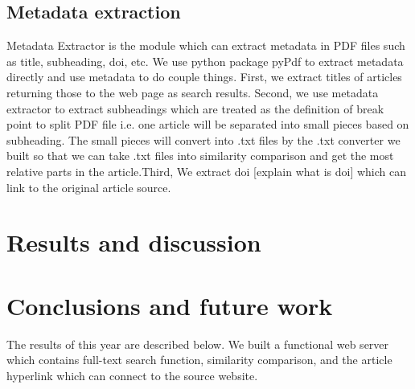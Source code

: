 \documentclass[a4paper,twocolumn,twoside]{article}
\begin{document}
	\subsection{Metadata extraction}
    Metadata Extractor is the module which can extract metadata in PDF files such as title, subheading, doi, etc. We use python package pyPdf to extract metadata directly and use metadata to do couple things. First, we extract titles of articles returning those to the web page as search results. Second, we use metadata extractor to extract subheadings which are treated as the definition of break point to split PDF file i.e. one article will be separated into small pieces based on subheading. The small pieces will convert into .txt files by the .txt converter we built so that we can take .txt files into similarity comparison and get the most relative parts in the article.Third, We extract doi [explain what is doi] which can link to the original article source. 
	
	

	
	\section{Results and discussion}


	\section{Conclusions and future work}
    The results of this year are described below. We built a functional web server which contains full-text search function, similarity comparison, and the article hyperlink which can connect to the source website.
		
	
	\clearpage 
\end{document}
